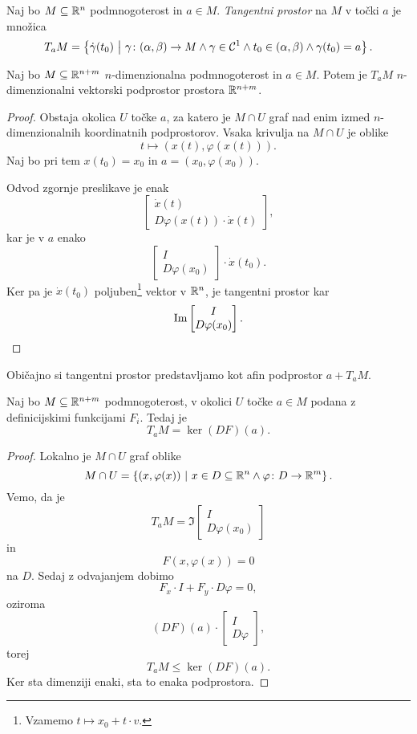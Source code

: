 \begin{definicija}
Naj bo $M \subseteq \R^n$ podmnogoterost in $a \in M$.
\emph{Tangentni prostor} na
$M$ v točki $a$ je množica
\[
T_aM = \setb{\dot{\gamma}(t_0)}
{\gamma \colon (\alpha, \beta) \to M \land
\gamma \in \mathcal{C}^1
\land t_0 \in (\alpha, \beta) \land
\gamma(t_0) = a}.
\]
\end{definicija}

\begin{trditev}
Naj bo $M \subseteq \R^{n+m}$ $n$-dimenzionalna podmnogoterost in
$a \in M$. Potem je $T_aM$ $n$-dimenzionalni vektorski podprostor
prostora $\R^{n+m}$.
\end{trditev}

\begin{proof}
Obstaja okolica $U$ točke $a$, za katero je $M \cap U$ graf nad
enim izmed $n$-dimen\-zionalnih koordinatnih podprostorov. Vsaka
krivulja na $M \cap U$ je oblike
\[
t \mapsto (x(t), \varphi(x(t))).
\]
Naj bo pri tem $x(t_0) = x_0$ in $a = (x_0, \varphi(x_0))$.

Odvod zgornje preslikave je enak
\[
\begin{bmatrix}
\dot{x}(t) \\
D\varphi(x(t)) \cdot \dot{x}(t)
\end{bmatrix},
\]
kar je v $a$ enako
\[
\begin{bmatrix}
I \\
D\varphi(x_0)
\end{bmatrix}
\cdot \dot{x}(t_0).
\]
Ker pa je $\dot{x}(t_0)$ poljuben\footnote{Vzamemo
$t \mapsto x_0 + t \cdot v$.} vektor v $\R^n$, je tangentni prostor
kar
\[
\Im
\begin{bmatrix}
I \\
D\varphi(x_0)
\end{bmatrix}. \qedhere
\]
\end{proof}

\begin{opomba}
Običajno si tangentni prostor predstavljamo kot afin podprostor
$a + T_aM$.
\end{opomba}

\begin{posledica}
Naj bo $M \subseteq \R^{n+m}$ podmnogoterost, v okolici $U$ točke
$a \in M$ podana z definicijskimi funkcijami $F_i$. Tedaj je
\[
T_aM = \ker(DF)(a).
\]
\end{posledica}

\begin{proof}
Lokalno je $M \cap U$ graf oblike
\[
M \cap U = \setb{(x, \varphi(x))}
{x \in D \subseteq \R^n \land \varphi \colon D \to \R^m}.
\]
Vemo, da je
\[
T_aM = \Im
\begin{bmatrix}
I \\
D\varphi(x_0)
\end{bmatrix}
\]
in
\[
F(x, \varphi(x)) = 0
\]
na $D$. Sedaj z odvajanjem dobimo
\[
F_x \cdot I + F_y \cdot D\varphi = 0,
\]
oziroma
\[
(DF)(a) \cdot
\begin{bmatrix}
I \\
D\varphi
\end{bmatrix},
\]
torej
\[
T_aM \leq \ker(DF)(a).
\]
Ker sta dimenziji enaki, sta to enaka podprostora.
\end{proof}

